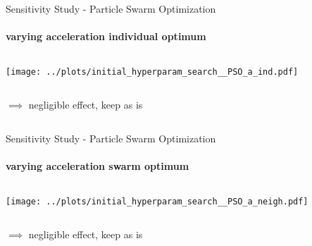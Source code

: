 \documentclass[11pt,aspectratio=169]{beamer}
\begin{document}
\begin{frame}{Sensitivity Study - Particle Swarm Optimization}
    \framesubtitle{varying \textbf{acceleration individual optimum}}

    \begin{columns}
    \begin{column}{0.8\textwidth}
        \texttt{[image: ../plots/initial\_hyperparam\_search\_\_PSO\_a\_ind.pdf]}
    \end{column}
    \end{columns}

    \begin{columns}
        \begin{column}{0.8\textwidth}
            $\implies$ negligible effect, keep as is
        \end{column}
        \begin{column}{0.1\textwidth}
            \tiny{}
        \end{column}
    \end{columns}
\end{frame}

%
%

\begin{frame}{Sensitivity Study - Particle Swarm Optimization}
    \framesubtitle{varying \textbf{acceleration swarm optimum}}

    \begin{columns}
    \begin{column}{0.8\textwidth}
        \texttt{[image: ../plots/initial\_hyperparam\_search\_\_PSO\_a\_neigh.pdf]}
    \end{column}
    \end{columns}

    \begin{columns}
        \begin{column}{0.8\textwidth}
            $\implies$ negligible effect, keep as is
        \end{column}
        \begin{column}{0.1\textwidth}
            \tiny{}
        \end{column}
    \end{columns}
\end{frame}

%
%
\end{document}
